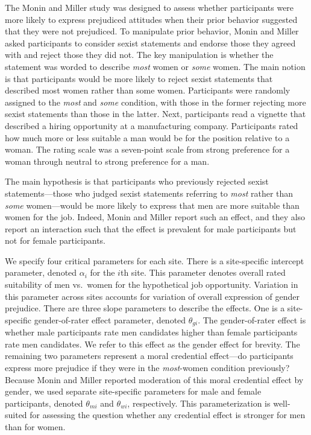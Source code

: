 \documentclass[english,man]{apa6}
\theoremstyle{definition}
\theoremstyle{definition}
\theoremstyle{remark}
\begin{document}
The Monin and Miller study was designed to assess whether participants
were more likely to express prejudiced attitudes when their prior
behavior suggested that they were not prejudiced. To manipulate prior
behavior, Monin and Miller asked participants to consider sexist
statements and endorse those they agreed with and reject those they did
not. The key manipulation is whether the statement was worded to
describe \emph{most} women or \emph{some} women. The main notion is that
participants would be more likely to reject sexist statements that
described most women rather than some women. Participants were randomly
assigned to the \emph{most} and \emph{some} condition, with those in the
former rejecting more sexist statements than those in the latter. Next,
participants read a vignette that described a hiring opportunity at a
manufacturing company. Participants rated how much more or less suitable
a man would be for the position relative to a woman. The rating scale
was a seven-point scale from strong preference for a woman through
neutral to strong preference for a man.

The main hypothesis is that participants who previously rejected sexist
statements---those who judged sexist statements referring to \emph{most}
rather than \emph{some} women---would be more likely to express that men
are more suitable than women for the job. Indeed, Monin and Miller
report such an effect, and they also report an interaction such that the
effect is prevalent for male participants but not for female
participants.

We specify four critical parameters for each site. There is a
site-specific intercept parameter, denoted \(\alpha_i\) for the \(i\)th
site. This parameter denotes overall rated suitability of men vs.~women
for the hypothetical job opportunity. Variation in this parameter across
sites accounts for variation of overall expression of gender prejudice.
There are three slope parameters to describe the effects. One is a
site-specific gender-of-rater effect parameter, denoted \(\theta_{gi}\).
The gender-of-rater effect is whether male participants rate men
candidates higher than female participants rate men candidates. We refer
to this effect as the gender effect for brevity. The remaining two
parameters represent a moral credential effect---do participants express
more prejudice if they were in the \emph{most}-women condition
previously? Because Monin and Miller reported moderation of this moral
credential effect by gender, we used separate site-specific parameters
for male and female participants, denoted \(\theta_{mi}\) and
\(\theta_{wi}\), respectively. This parameterization is well-suited for
assessing the question whether any credential effect is stronger for men
than for women.
\end{document}
